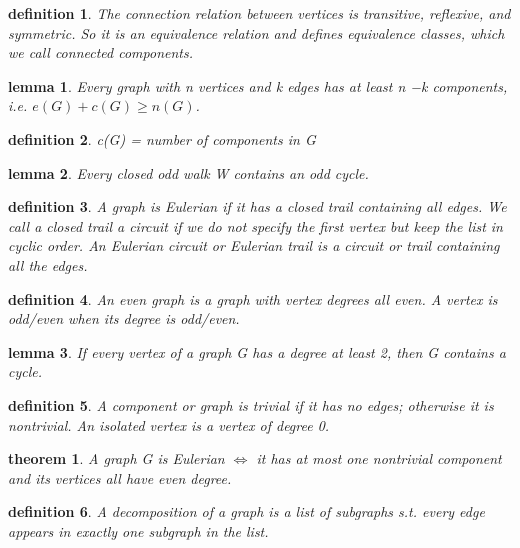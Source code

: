 \documentclass[twocolumn]{article}
\newtheorem{theorem}{theorem}[section]  %
\newtheorem{definition}{definition}
\newtheorem{lemma}{lemma}
\begin{document}
\begin{CJK*}{UTF8}{bkai}
    \begin{definition}
        The connection relation between vertices is transitive, reflexive, and
 symmetric. So it is an equivalence relation and defines equivalence classes,
 which we call connected components.
    \end{definition}

    \begin{lemma}
         Every graph with n vertices and k edges has at least n −k components, i.e.
 $e(G) +c(G) \geq n(G)$.
    \end{lemma}

    \begin{definition}
         c(G) = number of components in G
    \end{definition}

    \begin{lemma}
         Every closed odd walk W contains an odd cycle.
    \end{lemma}

    \begin{definition}
        A graph is Eulerian if it has a closed trail containing all edges. We call a
 closed trail a circuit if we do not specify the first vertex but keep the list in
 cyclic order. An Eulerian circuit or Eulerian trail is a circuit or trail
 containing all the edges.
    \end{definition}

    \begin{definition}
        An even graph is a graph with vertex degrees all even. A vertex is odd/even
 when its degree is odd/even.
    \end{definition}

    \begin{lemma}
        If every vertex of a graph G has a degree at least 2, then G contains a cycle.
    \end{lemma}

    \begin{definition}
         A component or graph is trivial if it has no edges; otherwise it is nontrivial.
 An isolated vertex is a vertex of degree 0.
    \end{definition}

    \begin{theorem}
        A graph G is Eulerian $\iff$ it has at most one nontrivial component and its
 vertices all have even degree.
    \end{theorem}
    
    \begin{definition}
        A decomposition of a graph is a list of subgraphs s.t. every edge appears in
 exactly one subgraph in the list.
    \end{definition}


\end{CJK*}
\end{document}
